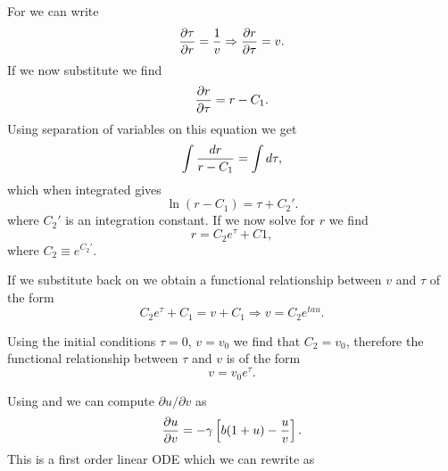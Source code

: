 For \eref[eq_ODE_3] we can write
\begin{equation}
  {\partial \tau \over \partial r} = {1 \over v} \Rightarrow
  {\partial r \over \partial \tau} = v.
\end{equation}
If we now substitute  we find
\begin{equation}
  {\partial r \over \partial \tau} = r - C_1.
\end{equation}
Using separation of variables on this equation we get
\begin{equation}
  \int {dr \over r - C_1} = \int d\tau,
\end{equation}
which when integrated gives
\begin{equation}
  \ln (r - C_1) = \tau + C_2'.
\end{equation}
where $C_2'$ is an integration constant. If we now solve for $r$ we find
\begin{equation}
  r = C_2e^{\tau} + C1,
  \label{eq_ODE_sol_3}
\end{equation}
where $C_2 \equiv e^{C_2'}$.

If we substitute  back on  we obtain a
functional relationship between $v$ and $\tau$ of the form
\begin{equation}
  C_2 e^{\tau} + C_1 = v + C_1 \Rightarrow
  v = C_2 e^{tau}.
\end{equation}

Using the initial conditions $\tau = 0$, $v=v_0$ we find that $C_2 = v_0$,
therefore the functional relationship between $\tau$ and $v$ is of the form
\begin{equation}
  v = v_0 e^{\tau}.
  \label{eq_v_tau_relation}
\end{equation}

Using \eref[eq_ODE_1] and \eref[eq_ODE_2] we can compute
$\partial u / \partial v$ as
\begin{equation}
  {\partial u \over \partial v} =
  - \gamma \left[ b (1 + u) - {u \over v} \right].
\end{equation}
This is a first order linear ODE which we can rewrite as
